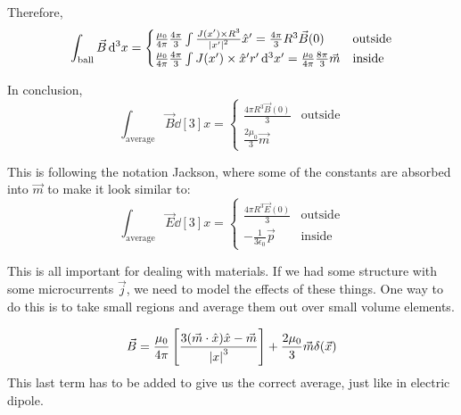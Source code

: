 \documentclass[a4paper,twoside,master.tex]{subfiles}
\begin{document}
Therefore,
\begin{equation}
    \int_{\text{ball}} \vec{B} \dd[3]{x} = \begin{cases} \frac{\mu_0}{4 \pi} \frac{4 \pi}{3} \int \frac{J(x') \times R^3 }{\abs{x'}^2} \hat{x}' = \frac{4 \pi}{3} R^3 \vec{B}(0) & \text{outside}\\
    \frac{\mu_0}{4 \pi} \frac{4 \pi}{3} \int J(x') \times \hat{x}' r' \dd[3]{x'} = \frac{\mu_0}{4 \pi} \frac{8 \pi}{3} \vec{m} & \text{inside} \end{cases} 
\end{equation}

In conclusion,
\begin{equation}
    \int_{\text{average}} \vec{B}  \dd[3]{x} = \begin{cases} \frac{4 \pi R^3 \vec{B}(0)}{3} & \text{outside} \\ \frac{2 \mu_0}{3} \vec{m} \end{cases}
\end{equation}

This is following the notation Jackson, where some of the constants are absorbed into $ \vec{m} $ to make it look similar to:
\begin{equation}
    \int_{\text{average}} \vec{E} \dd[3]{x} = \begin{cases} \frac{4 \pi R^3 \vec{E}(0)}{3} & \text{outside} \\ - \frac{1}{3 \epsilon_0} \vec{p} & \text{inside}  \end{cases} 
\end{equation}

This is all important for dealing with materials. If we had some structure with some microcurrents $ \vec{j} $, we need to model the effects of these things. One way to do this is to take small regions and average them out over small volume elements.

\begin{equation}
    \vec{B} = \frac{\mu_0}{4 \pi} \left[ \frac{3( \vec{m} \cdot \hat{x}) \hat{x} - \vec{m}}{\abs{x}^3} \right] + \frac{2 \mu_0}{3} \vec{m} \delta( \vec{x} )
\end{equation}
This last term has to be added to give us the correct average, just like in electric dipole. 
\end{document}
